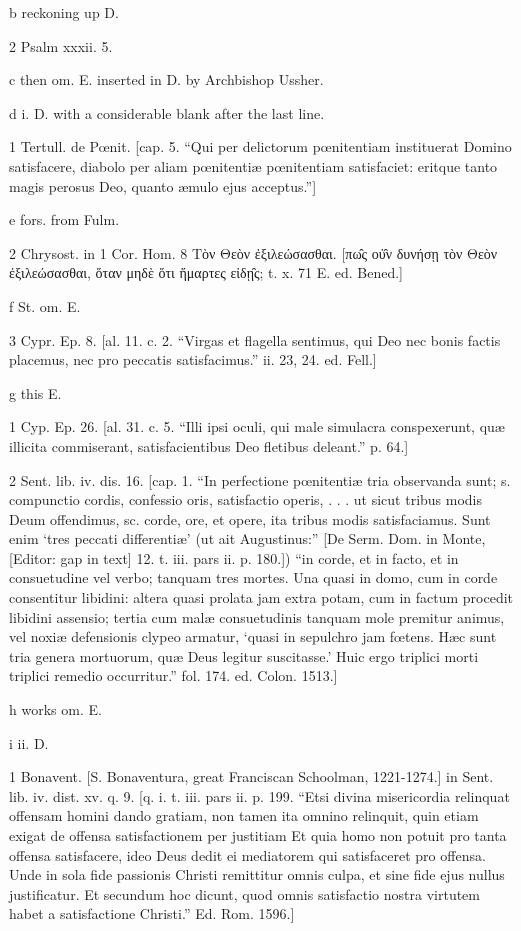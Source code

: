 b
reckoning up D.

2
Psalm xxxii. 5.

c
then om. E. inserted in D. by Archbishop Ussher.

d
i. D. with a considerable blank after the last line.

1
Tertull. de Pœnit. [cap. 5. “Qui per delictorum pœnitentiam instituerat Domino satisfacere, diabolo per aliam pœnitentiæ pœnitentiam satisfaciet: eritque tanto magis perosus Deo, quanto æmulo ejus acceptus.”]

e
fors. from Fulm.

2
Chrysost. in 1 Cor. Hom. 8 Τὸν Θεὸν ἐξιλεώσασθαι. [πω̑ς οὐ̑ν δυνήσῃ τὸν Θεὸν ἐξιλεώσασθαι, ὅταν μηδὲ ὅτι ἥμαρτες εἰδῃ̑ς; t. x. 71 E. ed. Bened.]

f
St. om. E.

3
Cypr. Ep. 8. [al. 11. c. 2. “Virgas et flagella sentimus, qui Deo nec bonis factis placemus, nec pro peccatis satisfacimus.” ii. 23, 24. ed. Fell.]

g
this E.

1
Cyp. Ep. 26. [al. 31. c. 5. “Illi ipsi oculi, qui male simulacra conspexerunt, quæ illicita commiserant, satisfacientibus Deo fletibus deleant.” p. 64.]

2
Sent. lib. iv. dis. 16. [cap. 1. “In perfectione pœnitentiæ tria observanda sunt; s. compunctio cordis, confessio oris, satisfactio operis, . . . ut sicut tribus modis Deum offendimus, sc. corde, ore, et opere, ita tribus modis satisfaciamus. Sunt enim ‘tres peccati differentiæ’ (ut ait Augustinus:” [De Serm. Dom. in Monte, [Editor: gap in text] 12. t. iii. pars ii. p. 180.]) “in corde, et in facto, et in consuetudine vel verbo; tanquam tres mortes. Una quasi in domo, cum in corde consentitur libidini: altera quasi prolata jam extra potam, cum in factum procedit libidini assensio; tertia cum malæ consuetudinis tanquam mole premitur animus, vel noxiæ defensionis clypeo armatur, ‘quasi in sepulchro jam fœtens. Hæc sunt tria genera mortuorum, quæ Deus legitur suscitasse.’ Huic ergo triplici morti triplici remedio occurritur.” fol. 174. ed. Colon. 1513.]

h
works om. E.

i
ii. D.

1
Bonavent. [S. Bonaventura, great Franciscan Schoolman, 1221-1274.] in Sent. lib. iv. dist. xv. q. 9. [q. i. t. iii. pars ii. p. 199. “Etsi divina misericordia relinquat offensam homini dando gratiam, non tamen ita omnino relinquit, quin etiam exigat de offensa satisfactionem per justitiam Et quia homo non potuit pro tanta offensa satisfacere, ideo Deus dedit ei mediatorem qui satisfaceret pro offensa. Unde in sola fide passionis Christi remittitur omnis culpa, et sine fide ejus nullus justificatur. Et secundum hoc dicunt, quod omnis satisfactio nostra virtutem habet a satisfactione Christi.” Ed. Rom. 1596.]

